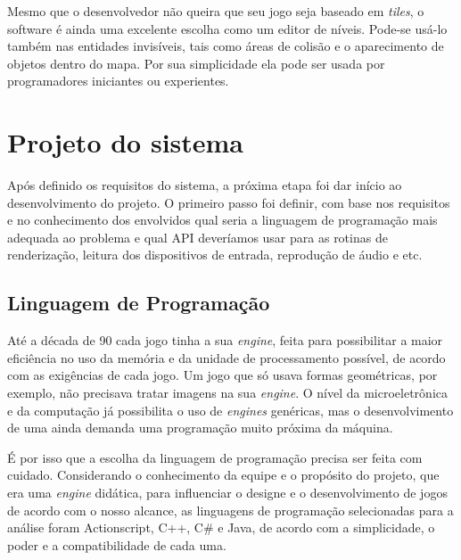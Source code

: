 %
\par
Mesmo que o desenvolvedor não queira que seu jogo seja baseado em \textit{tiles}, o software é ainda uma excelente escolha como um editor 
de níveis. Pode-se usá-lo também nas entidades invisíveis, tais como áreas de colisão e o aparecimento de objetos dentro do 
mapa. Por sua simplicidade ela pode ser usada por programadores iniciantes ou experientes.
%
%
%
%
\section{Projeto do sistema}
%
Após definido os requisitos do sistema, a próxima etapa foi dar início ao desenvolvimento do projeto. O primeiro passo foi definir, com base nos requisitos e no conhecimento dos envolvidos qual seria a linguagem de programação mais adequada ao problema e qual API deveríamos usar para as rotinas de renderização, leitura dos dispositivos de entrada, reprodução de áudio e etc.
%
%
\subsection{Linguagem de Programação}
\label{linguagem}
%
Até a década de 90 cada jogo tinha a sua \textit{engine}, feita para possibilitar a maior eficiência no uso da memória e da unidade de 
processamento possível, de acordo com as exigências de cada jogo. Um jogo que só usava formas geométricas, por exemplo, não precisava 
tratar imagens na sua \textit{engine}. O nível da microeletrônica e da computação já possibilita o uso de \textit{engines} genéricas, 
mas o desenvolvimento de uma ainda demanda uma programação muito próxima da máquina. 
\par
É por isso que a escolha da linguagem de programação precisa ser feita com cuidado. Considerando o conhecimento da equipe e o propósito do 
projeto, que era uma \textit{engine} didática, para influenciar o designe e o desenvolvimento de jogos de acordo com o nosso alcance, as linguagens de programação selecionadas para a análise foram Actionscript, C++, C\# e Java, de acordo com a simplicidade, o poder e a compatibilidade de cada uma.
%
